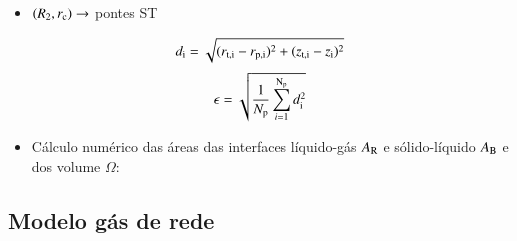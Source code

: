 \documentclass[8pt]{beamer}
\begin{document}
\begin{frame}
\begin{block}
\begin{minipage}{0.44\textwidth}
\begin{itemize}
	  			\item $(R_2,r_{\rm c})\rightarrow$ pontes ST
	  		\end{itemize}
			$$d_{\rm i} =\sqrt{(r_{\rm t,i} - r_{\rm p,i})^{\rm 2} +(z_{\rm t,i} - z_{\rm i})^{\rm 2}}$$
			$$\epsilon = \sqrt{\frac{1}{N_{\rm p}} \sum_{i=1}^{\rm N_{\rm p}} d_{\rm i}^{\rm 2}}$$
	  \end{minipage}
      \begin{itemize}
	  	\item \small Cálculo numérico das áreas das interfaces líquido-gás $A_{\rm R}$ e sólido-líquido $A_{\rm B}$ e dos volume $\Omega$:
	  \end{itemize}
	\end{block}
\end{frame}


\subsection{Modelo gás de rede}
\end{document}
